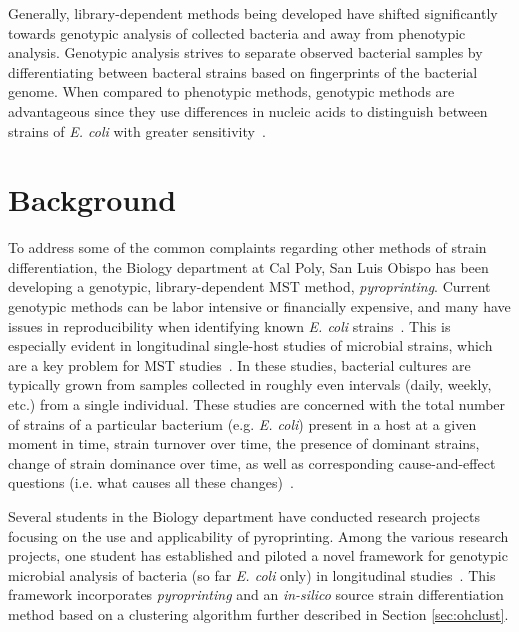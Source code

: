 \documentclass[12pt]{ucthesis}
\begin{document}
   Generally, library-dependent methods being developed have shifted
   significantly towards genotypic analysis of collected bacteria and away from
   phenotypic analysis. Genotypic analysis strives to separate observed
   bacterial samples by differentiating between bacteral strains based on
   fingerprints of the bacterial genome. When compared to phenotypic methods,
   genotypic methods are advantageous since they use differences in nucleic
   acids to distinguish between strains of \textit{E. coli} with greater
   sensitivity~\cite{Anderson:Diversity, Gordon:StrainTyping, Ochman:Enzyme,
   Scott:CurrentMST, Simpson:StateOf}.

\chapter{Background}\label{chap:background}
   To address some of the common complaints regarding other methods of strain
   differentiation, the Biology department at Cal Poly, San Luis Obispo has
   been developing a genotypic, library-dependent MST method,
   \textit{pyroprinting}. Current genotypic methods can be labor intensive or
   financially expensive, and many have issues in reproducibility when
   identifying known \textit{E. coli} strains~\cite{Gordon:StrainTyping,
   Scott:CurrentMST, Simpson:StateOf}. This is especially evident in
   longitudinal single-host studies of microbial strains, which are a key
   problem for MST studies~\cite{Simpson:StateOf, Anderson:Diversity,
   Schlager:Clonal}. In these studies, bacterial cultures are typically grown
   from samples collected in roughly even intervals (daily, weekly, etc.) from
   a single individual. These studies are concerned with the total number of
   strains of a particular bacterium (e.g. \textit{E. coli}) present in a host
   at a given moment in time, strain turnover over time, the presence of
   dominant strains, change of strain dominance over time, as well as
   corresponding cause-and-effect questions (i.e. what causes all these
   changes)~\cite{Anderson:Diversity, Caugant:Diverse, Sears:Persist,
   Simpson:StateOf}.
   
   Several students in the Biology department have conducted research projects
   focusing on the use and applicability of pyroprinting. Among the various
   research projects, one student has established and piloted a novel framework
   for genotypic microbial analysis of bacteria (so far \textit{E. coli} only)
   in longitudinal studies~\cite{Montana:ChronoCluster, Montana:CRC}. This
   framework incorporates \textit{pyroprinting} and an \textit{in-silico}
   source strain differentiation method based on a clustering algorithm further
   described in Section \ref{sec:ohclust}.
   
\end{document}
